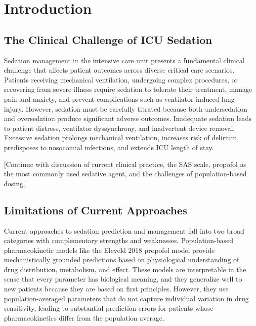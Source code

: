 \documentclass[11pt,a4paper]{article}
\begin{document}
%

\section{Introduction}

\subsection{The Clinical Challenge of ICU Sedation}

Sedation management in the intensive care unit presents a fundamental clinical challenge that affects patient outcomes across diverse critical care scenarios. Patients receiving mechanical ventilation, undergoing complex procedures, or recovering from severe illness require sedation to tolerate their treatment, manage pain and anxiety, and prevent complications such as ventilator-induced lung injury. However, sedation must be carefully titrated because both undersedation and oversedation produce significant adverse outcomes. Inadequate sedation leads to patient distress, ventilator dyssynchrony, and inadvertent device removal. Excessive sedation prolongs mechanical ventilation, increases risk of delirium, predisposes to nosocomial infections, and extends ICU length of stay.

[Continue with discussion of current clinical practice, the SAS scale, propofol as the most commonly used sedative agent, and the challenges of population-based dosing.]

\subsection{Limitations of Current Approaches}

Current approaches to sedation prediction and management fall into two broad categories with complementary strengths and weaknesses. Population-based pharmacokinetic models like the Eleveld 2018 propofol model provide mechanistically grounded predictions based on physiological understanding of drug distribution, metabolism, and effect. These models are interpretable in the sense that every parameter has biological meaning, and they generalize well to new patients because they are based on first principles. However, they use population-averaged parameters that do not capture individual variation in drug sensitivity, leading to substantial prediction errors for patients whose pharmacokinetics differ from the population average.
\end{document}

